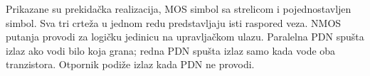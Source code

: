 Prikazane su prekidačka realizacija, MOS simbol sa strelicom i pojednostavljen simbol. Sva tri crteža u jednom redu predstavljaju isti raspored veza. NMOS putanja provodi za logičku jedinicu na upravljačkom ulazu. Paralelna PDN spušta izlaz ako vodi bilo koja grana; redna PDN spušta izlaz samo kada vode oba tranzistora. Otpornik podiže izlaz kada PDN ne provodi.
